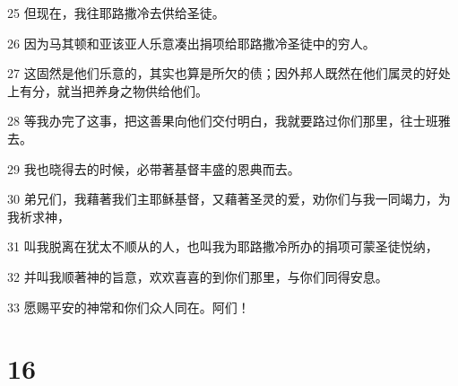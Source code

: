 \par 25 但现在，我往耶路撒冷去供给圣徒。
\par 26 因为马其顿和亚该亚人乐意凑出捐项给耶路撒冷圣徒中的穷人。
\par 27 这固然是他们乐意的，其实也算是所欠的债；因外邦人既然在他们属灵的好处上有分，就当把养身之物供给他们。
\par 28 等我办完了这事，把这善果向他们交付明白，我就要路过你们那里，往士班雅去。
\par 29 我也晓得去的时候，必带著基督丰盛的恩典而去。
\par 30 弟兄们，我藉著我们主耶稣基督，又藉著圣灵的爱，劝你们与我一同竭力，为我祈求神，
\par 31 叫我脱离在犹太不顺从的人，也叫我为耶路撒冷所办的捐项可蒙圣徒悦纳，
\par 32 并叫我顺著神的旨意，欢欢喜喜的到你们那里，与你们同得安息。
\par 33 愿赐平安的神常和你们众人同在。阿们！

\chapter{16}

